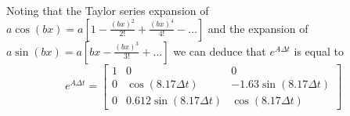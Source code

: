 \documentclass[11pt]{article}
\begin{document}
Noting that the Taylor series expansion of $a\cos(bx) = a[1-\frac{(bx)^2}{2!}+\frac{(bx)^4}{4!} - \dots]$ and the expansion of $a\sin(bx) = a[bx-\frac{(bx)^3}{3!} + ...]$ we can deduce that $e^{A\Delta t}$ is equal to
\begin{equation*}
	e^{A\Delta t} = \begin{bmatrix} 1 & 0 & 0 \\
		0 & \cos(8.17\Delta t) & -1.63\sin(8.17\Delta t) \\
		0 & 0.612\sin(8.17\Delta t) & \cos(8.17\Delta t)
		\end{bmatrix}
\end{equation*}
\end{document}
